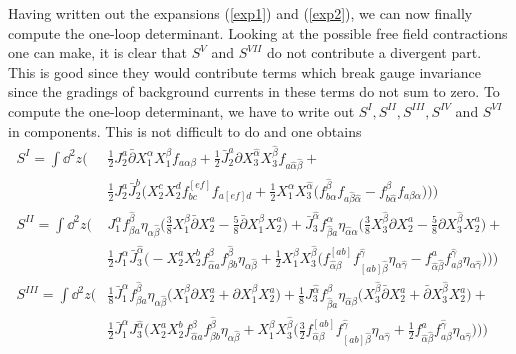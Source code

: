 \documentclass[12pt]{article}
\numberwithin{equation}{section}
\newcommand{\h}[1]{\hat{#1}}
\begin{document}
Having written out the expansions (\ref{exp1}) and (\ref{exp2}), we can now finally compute the one-loop determinant. Looking at the possible free field contractions one can make, it is clear that $S^{V}$ and $S^{VII}$ do not contribute a divergent part. This is good since they would contribute terms which break gauge invariance since the gradings of background currents in these terms do not sum to zero. To compute the one-loop determinant, we have to write out $S^{I}, S^{II}, S^{III}, S^{IV}$ and $S^{VI}$ in components. This is not difficult to do and one obtains
{\allowdisplaybreaks
\begin{align}
	S^I = \int \dd^2 z \big(&\frac{1}{2} J_2^a \bar{\partial} X^\alpha_1 X_1^\beta f_{a \alpha \beta} + \frac{1}{2} \bar{J}_2^a \partial X_3^{\h{\alpha}} X_3^{\h{\beta}} f_{a \h{\alpha}\h{\beta}} + \\ &\frac{1}{2} J_2^a \bar{J}_2^b \big(X_2^c X_2^d f_{bc}^{[ef]} f_{a [ef] d} + \frac{1}{2} X_1^\alpha X_3^{\h{\alpha}} (f_{b\alpha}^{\h{\beta}} f_{a \h{\beta} \h{\alpha}} - f^\beta_{b\h{\alpha}} f_{a\beta \alpha} \big) \big)\big) \nonumber \\
	S^{II} = \int \dd^2 z \big(&J_1^\alpha f_{\beta a}^{\h{\beta}} \eta_{\alpha \h{\beta}}\big(\frac{3}{8} X_1^\beta \bar{\partial} X_2^a -\frac{5}{8} \bar{\partial} X_1^\beta X_2^a\big) + \bar{J}_3^{\h{\alpha}} f_{\h{\beta} a}^\alpha \eta_{\h{\alpha}\alpha}\big(\frac{3}{8} X_3^{\h{\beta}} \partial X_2^a - \frac{5}{8} \partial X_3^{\h{\beta}} X_2^a \big) + \nonumber \\
						  &\frac{1}{2} J_1^\alpha \bar{J}_3^{\h{\alpha}} \big(-X_2^a X_2^b f_{\h{\alpha}a}^\beta f_{\beta b}^{\h{\beta}} \eta_{\alpha \h{\beta}} + \frac{1}{2} X_1^\beta X_3^{\h{\beta}}\big(f_{\h{\alpha}\beta}^{[ab]} f_{[ab]\h{\beta}}^{\h{\gamma}} \eta_{\alpha \h{\gamma}} - f_{\h{\alpha}\h{\beta}}^a f_{a\beta}^{\h{\gamma}} \eta_{\alpha \h{\gamma}} \big)\big)\big) \nonumber \\
		S^{III} = \int \dd^2 z \big(& \frac{1}{8}\bar{J}_1^\alpha  f_{\beta a}^{\h{\beta}} \eta_{\alpha \h{\beta}} \big(X_1^\beta \partial X_2^a + \partial X_1^\beta X_2^a \big) + \frac{1}{8} J_3^{\h{\alpha}} f_{\h{\beta} a}^\beta \eta_{\h{\alpha}\beta} \big(X_3^{\h{\beta}} \bar{\partial} X_2^a + \bar{\partial} X_3^{\h{\beta}} X_2^a\big) + \nonumber \\
							   & \frac{1}{2} \bar{J}_1^\alpha J_3^{\h{\alpha}}\big(X_2^a X_2^b f_{\h{\alpha}a}^\beta f_{\beta b}^{\h{\beta}} \eta_{\alpha \h{\beta}} + X_1^\beta X_3^{\h{\beta}} \big(\frac{3}{2}f_{\h{\alpha}\beta}^{[ab]} f_{[ab]\h{\beta}}^{\h{\gamma}} \eta_{\alpha \h{\gamma}} +\frac{1}{2} f_{\h{\alpha}\h{\beta}}^a f_{a \beta}^{\h{\gamma}} \eta_{\alpha \h{\gamma}}  \big)\big)\big) \nonumber \\

\end{align}}
\end{document}
